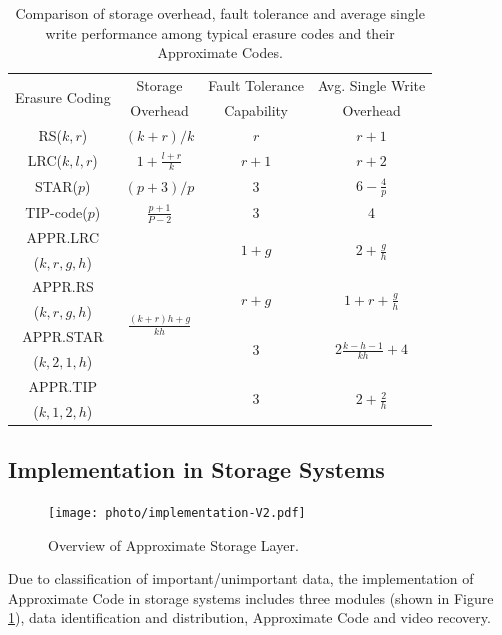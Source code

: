 \documentclass[sigconf]{acmart}
\begin{document}
\begin{table}[htb]\footnotesize
\centering
\caption{Comparison of storage overhead, fault tolerance and average single write performance among typical erasure codes and their Approximate Codes.}\label{tab-properties}
\begin{tabular}{|c|c|c|c|}
\hline
\multirow{2}{*}{Erasure Coding} & Storage & Fault Tolerance & Avg. Single Write \\
 & Overhead & Capability & Overhead \\ \hline
RS($k,r$) & $(k+r)/k$ & $r$ & $r+1$ \\ \hline
LRC($k,l,r$) & $1+\frac{l+r}{k}$ & $r+1$ & $r+2$ \\ \hline
STAR($p$) & $(p+3)/p$ & $3$ & $6-\frac{4}{p}$ \\ \hline
TIP-code($p$) & $\frac{p+1}{P-2}$ & $3$ & 4 \\ \hline
APPR.LRC & \multirow{8}{*}{$\frac{(k+r)h+g}{kh}$} & \multirow{2}{*}{$1+g$} & \multirow{2}{*}{$2+\frac{g}{h}$} \\ 
($k,r,g,h$) &  &  &  \\ \cline{1-1} \cline{3-4} 
APPR.RS &  & \multirow{2}{*}{$r+g$} & \multirow{2}{*}{$1+r+\frac{g}{h}$} \\
($k,r,g,h$) &  &  &  \\ \cline{1-1} \cline{3-4} 
APPR.STAR &  & \multirow{2}{*}{3} & \multirow{2}{*}{$2\frac{k-h-1}{kh}+4$} \\
($k,2,1,h$) &  &  &  \\ \cline{1-1} \cline{3-4} 
APPR.TIP &  & \multirow{2}{*}{3} & \multirow{2}{*}{$2+\frac{2}{h}$} \\
($k,1,2,h$) &  &  &  \\ \hline
\end{tabular}
\end{table}


\subsection{Implementation in Storage Systems}\label{Implementation}

\begin{figure}[htb]
\centering
\texttt{[image: photo/implementation-V2.pdf]}
\caption{Overview of Approximate Storage Layer.}
\label{fig-implementation}
\end{figure}


Due to classification of important/unimportant data, the implementation of Approximate Code in storage systems includes three modules (shown in Figure \ref{fig-implementation}), data identification and distribution, Approximate Code and video recovery.
\end{document}
